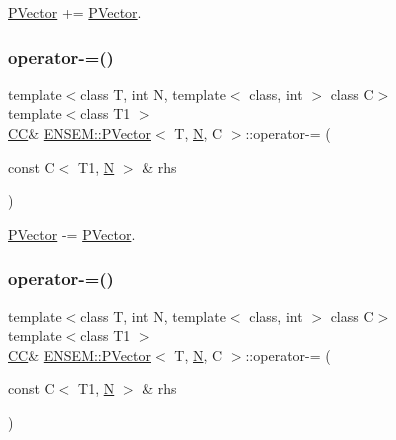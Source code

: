 \mbox{\hyperlink{classENSEM_1_1PVector}{P\+Vector}} += \mbox{\hyperlink{classENSEM_1_1PVector}{P\+Vector}}. 

\mbox{\label{classENSEM_1_1PVector_afe4c144dcca484fed4ee1924d1e387be}} 
\subsubsection{\texorpdfstring{operator-\/=()}{operator-=()}\hspace{0.1cm}{\footnotesize\ttfamily [1/2]}}
{\footnotesize\ttfamily template$<$class T, int N, template$<$ class, int $>$ class C$>$ \\
template$<$class T1 $>$ \\
\mbox{\hyperlink{classENSEM_1_1PVector_a92dc0a0a301a3dc96f7be5d337019bc7}{CC}}\& \mbox{\hyperlink{classENSEM_1_1PVector}{E\+N\+S\+E\+M\+::\+P\+Vector}}$<$ T, \mbox{\hyperlink{operator__name__util_8cc_a7722c8ecbb62d99aee7ce68b1752f337}{N}}, C $>$\+::operator-\/= (\begin{DoxyParamCaption}\item[{const C$<$ T1, \mbox{\hyperlink{operator__name__util_8cc_a7722c8ecbb62d99aee7ce68b1752f337}{N}} $>$ \&}]{rhs }\end{DoxyParamCaption})\hspace{0.3cm}{\ttfamily [inline]}}



\mbox{\hyperlink{classENSEM_1_1PVector}{P\+Vector}} -\/= \mbox{\hyperlink{classENSEM_1_1PVector}{P\+Vector}}. 

\mbox{\label{classENSEM_1_1PVector_afe4c144dcca484fed4ee1924d1e387be}} 
\subsubsection{\texorpdfstring{operator-\/=()}{operator-=()}\hspace{0.1cm}{\footnotesize\ttfamily [2/2]}}
{\footnotesize\ttfamily template$<$class T, int N, template$<$ class, int $>$ class C$>$ \\
template$<$class T1 $>$ \\
\mbox{\hyperlink{classENSEM_1_1PVector_a92dc0a0a301a3dc96f7be5d337019bc7}{CC}}\& \mbox{\hyperlink{classENSEM_1_1PVector}{E\+N\+S\+E\+M\+::\+P\+Vector}}$<$ T, \mbox{\hyperlink{operator__name__util_8cc_a7722c8ecbb62d99aee7ce68b1752f337}{N}}, C $>$\+::operator-\/= (\begin{DoxyParamCaption}\item[{const C$<$ T1, \mbox{\hyperlink{operator__name__util_8cc_a7722c8ecbb62d99aee7ce68b1752f337}{N}} $>$ \&}]{rhs }\end{DoxyParamCaption})\hspace{0.3cm}{\ttfamily [inline]}}



